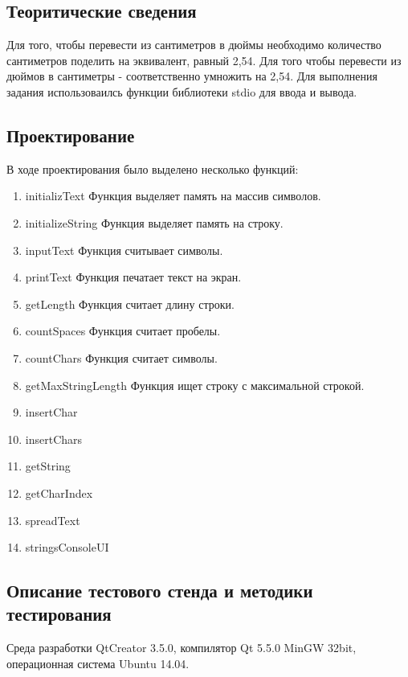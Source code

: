 \documentclass[12pt,a4paper]{report}
\begin{document}
\subsection{Теоритические сведения}
Для того, чтобы перевести из сантиметров в дюймы необходимо количество сантиметров поделить на эквивалент, равный 2,54. Для того чтобы перевести из дюймов в сантиметры - соответственно умножить на 2,54.
	Для выполнения задания использоваилсь функции библиотеки stdio для ввода и вывода.
\subsection{Проектирование}
В ходе проектирования было выделено несколько функций:
\begin{enumerate}
	\item initializText
	Функция выделяет память на массив символов.
	
	\item initializeString 
	Функция выделяет память на строку.
	
	\item inputText
	Функция считывает символы.
	
	\item printText
	Функция печатает текст на экран.
	
	\item getLength
	Функция считает длину строки.
	
	\item countSpaces
	Функция считает пробелы.
	
	\item countChars
	Функция считает символы.
	
	\item getMaxStringLength
	Функция ищет строку с максимальной строкой.
	
	\item insertChar
	
	\item insertChars
	
	\item getString
	
	\item getCharIndex
	
	\item spreadText
	
	\item stringsConsoleUI
\end{enumerate}
\subsection{Описание тестового стенда и методики тестирования}
Среда разработки QtCreator 3.5.0, компилятор Qt 5.5.0 MinGW 32bit, операционная система Ubuntu 14.04.
\end{document}
